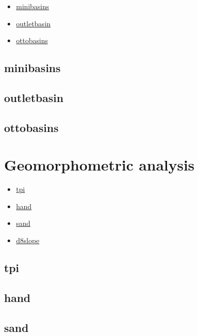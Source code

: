 \documentclass[
]{book}
\providecommand{\tightlist}{%
  \setlength{\itemsep}{0pt}\setlength{\parskip}{0pt}}
\theoremstyle{definition}
\theoremstyle{definition}
\theoremstyle{definition}
\theoremstyle{definition}
\theoremstyle{remark}
\begin{document}
\begin{itemize}
\tightlist
\item
  \hyperref[minibasins]{minibasins}\\
\item
  \hyperref[outletbasin]{outletbasin}\\
\item
  \hyperref[ottobasins]{ottobasins}
\end{itemize}

\subsection{minibasins}\label{minibasins}

\subsection{outletbasin}\label{outletbasin}

\subsection{ottobasins}\label{ottobasins}

\section{Geomorphometric analysis}\label{Geomorphometric-analysis}

\begin{itemize}
\tightlist
\item
  \hyperref[tpi]{tpi}\\
\item
  \hyperref[hand]{hand}\\
\item
  \hyperref[sand]{sand}\\
\item
  \hyperref[d8slope]{d8slope}
\end{itemize}

\subsection{tpi}\label{tpi}

\subsection{hand}\label{hand}

\subsection{sand}\label{sand}
\end{document}
